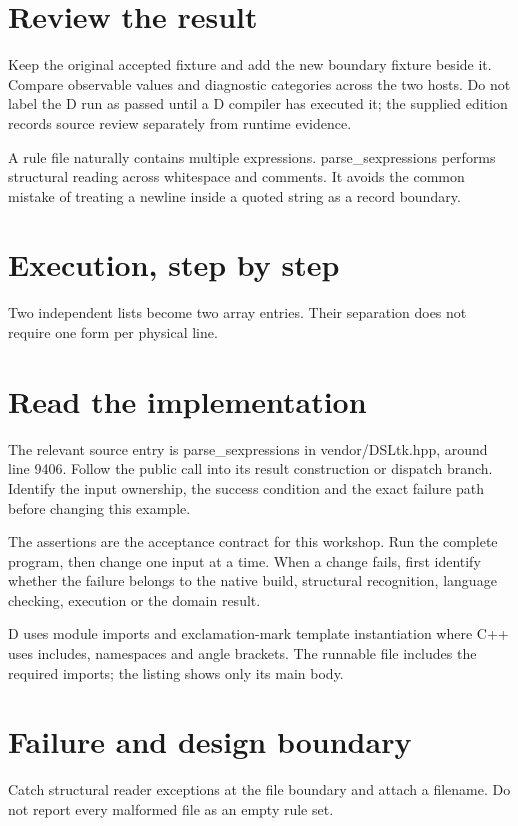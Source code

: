 \section*{Review the result}
Keep the original accepted fixture and add the new boundary fixture beside it. Compare observable values and diagnostic categories across the two hosts. Do not label the D run as passed until a D compiler has executed it; the supplied edition records source review separately from runtime evidence.

\clearpage
{}
A rule file naturally contains multiple expressions. parse\_sexpressions performs structural reading across whitespace and comments. It avoids the common mistake of treating a newline inside a quoted string as a record boundary.


\section*{Execution, step by step}
Two independent lists become two array entries. Their separation does not require one form per physical line.

\section*{Read the implementation}
The relevant source entry is parse\_sexpressions in vendor/DSLtk.hpp, around line 9406. Follow the public call into its result construction or dispatch branch. Identify the input ownership, the success condition and the exact failure path before changing this example.

The assertions are the acceptance contract for this workshop. Run the complete program, then change one input at a time. When a change fails, first identify whether the failure belongs to the native build, structural recognition, language checking, execution or the domain result.

\clearpage
{}
D uses module imports and exclamation-mark template instantiation where C++ uses includes, namespaces and angle brackets. The runnable file includes the required imports; the listing shows only its main body.


\section*{Failure and design boundary}
Catch structural reader exceptions at the file boundary and attach a filename. Do not report every malformed file as an empty rule set.

